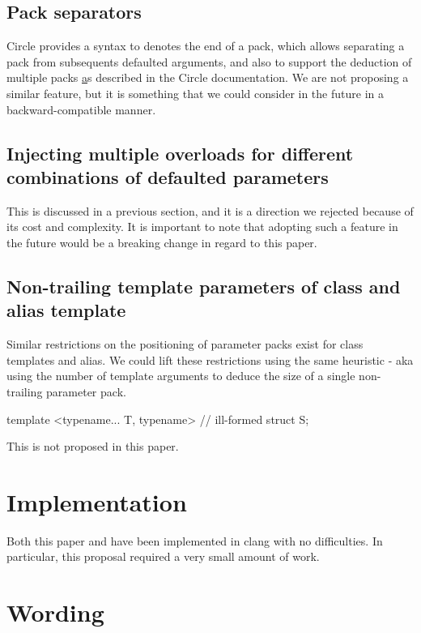 \documentclass{wg21}
\begin{document}
\subsection{Pack separators}

Circle provides a syntax to denotes the end of a pack, which allows separating a pack from subsequents defaulted arguments,
and also to support the deduction of multiple packs \href{https://github.com/seanbaxter/QDA/blob/master/README.md#parameter-packs} as described in the {Circle documentation}. We are not proposing a similar feature, but it is something that we could consider in the future in a backward-compatible manner.

\subsection{Injecting multiple overloads for different combinations of defaulted parameters}

This is discussed in a previous section, and it is a direction we rejected because of its cost and complexity.
It is important to note that adopting such a feature in the future would be a breaking change in regard to this paper.

\subsection{Non-trailing template parameters of class and alias template}

Similar restrictions on the positioning of parameter packs exist for class templates and alias.
We could lift these restrictions using the same heuristic - aka using the number of template arguments
to deduce the size of a single non-trailing parameter pack.

\begin{colorblock}
template <typename... T, typename> // ill-formed
struct S;
\end{colorblock}

This is not proposed in this paper.

\section{Implementation}
    
Both this paper and  have been implemented in clang with no difficulties.
In particular, this proposal required a very small amount of work.

\section{Wording}
\end{document}
